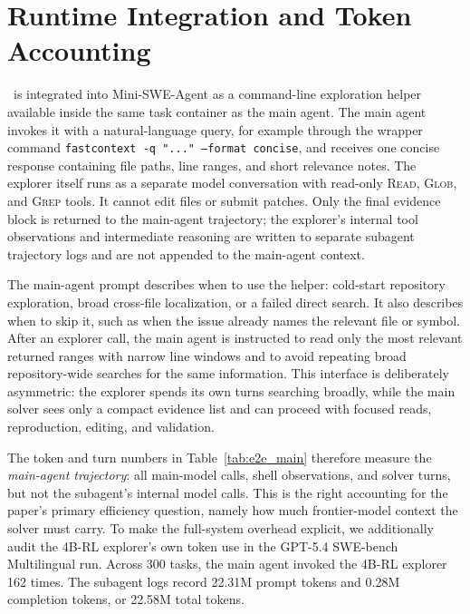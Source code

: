 \documentclass{llmxive}
\providecommand{\approach}{~}
\begin{document}
\section{Runtime Integration and Token Accounting}
\label{app:runtime-accounting}

\approach is integrated into Mini-SWE-Agent as a command-line exploration helper available inside the same task container as the main agent.
The main agent invokes it with a natural-language query, for example through the wrapper command \texttt{fastcontext -q "..." --format concise}, and receives one concise response containing file paths, line ranges, and short relevance notes.
The explorer itself runs as a separate model conversation with read-only \textsc{Read}, \textsc{Glob}, and \textsc{Grep} tools.
It cannot edit files or submit patches.
Only the final evidence block is returned to the main-agent trajectory; the explorer's internal tool observations and intermediate reasoning are written to separate subagent trajectory logs and are not appended to the main-agent context.

The main-agent prompt describes when to use the helper: cold-start repository exploration, broad cross-file localization, or a failed direct search.
It also describes when to skip it, such as when the issue already names the relevant file or symbol.
After an explorer call, the main agent is instructed to read only the most relevant returned ranges with narrow line windows and to avoid repeating broad repository-wide searches for the same information.
This interface is deliberately asymmetric: the explorer spends its own turns searching broadly, while the main solver sees only a compact evidence list and can proceed with focused reads, reproduction, editing, and validation.

The token and turn numbers in Table~\ref{tab:e2e_main} therefore measure the \emph{main-agent trajectory}: all main-model calls, shell observations, and solver turns, but not the subagent's internal model calls.
This is the right accounting for the paper's primary efficiency question, namely how much frontier-model context the solver must carry.
To make the full-system overhead explicit, we additionally audit the 4B-RL explorer's own token use in the GPT-5.4 SWE-bench Multilingual run.
Across 300 tasks, the main agent invoked the 4B-RL explorer 162 times.
The subagent logs record 22.31M prompt tokens and 0.28M completion tokens, or 22.58M total tokens.
\end{document}
